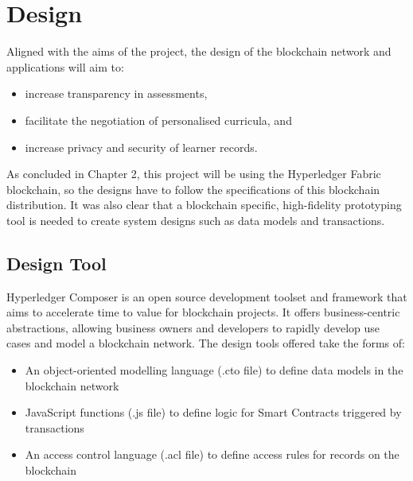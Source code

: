 \chapter{Design}
\graphicspath{{Chapter5/Figs/Raster/}{Chapter5/Figs/Tex/}{Chapter5/Figs/}}

Aligned with the aims of the project, the design of the blockchain network and applications will aim to:
\begin{itemize}
	\setlength\itemsep{0em}	
	\item increase transparency in assessments,
	\item facilitate the negotiation of personalised curricula, and
	\item increase privacy and security of learner records.
\end{itemize}

As concluded in Chapter 2, this project will be using the Hyperledger Fabric blockchain, 
so the designs have to follow the specifications of this blockchain distribution.
It was also clear that a blockchain specific, high-fidelity prototyping tool is needed
to create system designs such as data models and transactions.

\section{Design Tool}

Hyperledger Composer is an open source development toolset and framework that aims to
accelerate time to value for blockchain projects. It offers business-centric
abstractions, allowing business owners and developers to rapidly develop
use cases and model a blockchain network. The design tools offered take the forms of:
\begin{itemize}
	\setlength\itemsep{0em}
	\item An object-oriented modelling language (.cto file) to define data models in
	      the blockchain network
	\item JavaScript functions (.js file) to define logic for Smart Contracts triggered by transactions
	\item An access control language (.acl file) to define access rules for records on the blockchain\\
	      \citep{official2018composer}
\end{itemize}

